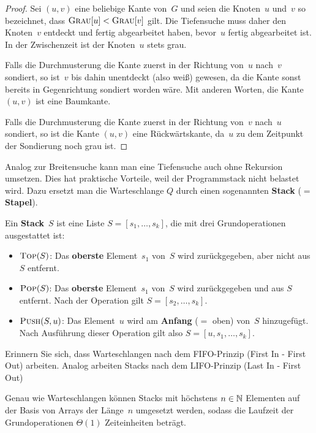 \begin{proof}
Sei $(u,v)$ eine beliebige Kante von~$G$ und seien die Knoten~$u$ und~$v$ so bezeichnet, dass $\mathop{\text{\textsc{Grau}}}[u] < \mathop{\text{\textsc{Grau}}}[v]$ gilt.
Die Tiefensuche muss daher den Knoten~$v$ entdeckt und fertig abgearbeitet haben, bevor~$u$ fertig abgearbeitet ist.
In der Zwischenzeit ist der Knoten~$u$ stets grau.

Falls die Durchmusterung die Kante zuerst in der Richtung von~$u$ nach~$v$ sondiert, so ist~$v$ bis dahin unentdeckt (also weiß) gewesen, da die Kante sonst bereits in Gegenrichtung sondiert worden wäre.
Mit anderen Worten, die Kante $(u,v)$ ist eine Baumkante.

Falls die Durchmusterung die Kante zuerst in der Richtung von~$v$ nach~$u$ sondiert, so ist die Kante $(u,v)$ eine Rückwärtskante, da~$u$ zu dem Zeitpunkt der Sondierung noch grau ist.
\end{proof}


\begin{bem}
	Analog zur Breitensuche kann man eine Tiefensuche auch ohne Rekursion umsetzen.
	Dies hat praktische Vorteile, weil der Programmstack nicht  belastet wird.
	Dazu ersetzt man die Warteschlange $Q$ durch einen sogenannten \textbf{Stack} ($=$ \textbf{Stapel}).
\end{bem}

\begin{defn} 
Ein \textbf{Stack}~$S$ ist eine Liste $S=[s_1,\ldots,s_k]$, die mit drei Grundoperationen ausgestattet ist:
\begin{itemize}
 \item $\mathop{\text{\textsc{Top}}}(S)$: Das \textbf{oberste} Element~$s_1$ von~$S$ wird zurückgegeben, aber nicht aus $S$ entfernt.

 \item $\mathop{\text{\textsc{Pop}}}(S)$: Das \textbf{oberste} Element~$s_1$ von~$S$ wird zurückgegeben und aus $S$ entfernt.
 Nach der Operation gilt $S=[s_2,\ldots,s_k]$.

 \item $\mathop{\text{\textsc{Push}}}(S,u)$: Das Element~$u$ wird am \textbf{Anfang} ($=$ oben) von~$S$ hinzugefügt.
 Nach Ausführung dieser Operation gilt also $S=[u,s_1,\ldots,s_k]$. 
\end{itemize}
\end{defn} 

\begin{bem}
Erinnern Sie sich, dass Warteschlangen nach dem FIFO-Prinzip (First In - First Out) arbeiten.
Analog arbeiten Stacks nach dem LIFO-Prinzip (Last In - First Out)

Genau wie Warteschlangen können Stacks mit höchstens $n \in \mathbb{N}$ Elementen auf der Basis von Arrays der Länge~$n$ umgesetzt werden, sodass die Laufzeit der Grundoperationen $\Theta(1)$ Zeiteinheiten beträgt. 
\end{bem} 
	
